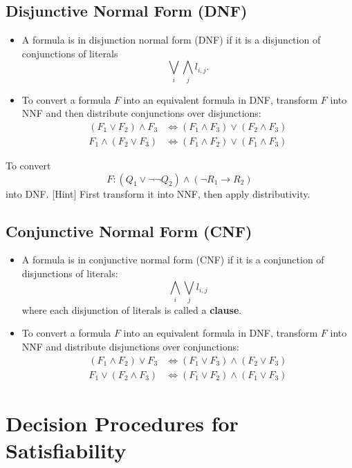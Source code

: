 \subsection{Disjunctive Normal Form (DNF)}
\begin{itemize}
	\item A formula is in disjunction normal form (DNF) if it is a disjunction of conjunctions of literals \[
	\bigvee_i\bigwedge_j l_{i,j}.
	\]
	\item To convert a formula $F$ into an equivalent formula in DNF, transform $F$ into NNF and then distribute conjunctions over disjunctions: \begin{align*}
		(F_1\lor F_2)\land F_3 &\iff (F_1\land F_3)\lor (F_2\land F_3) \\
		F_1\land (F_2\lor F_3) &\iff (F_1\land F_2)\lor (F_1\land F_3)
	\end{align*}
\end{itemize}

\begin{exercise}
	To convert \[
	F:(Q_1\lor\lnot\lnot Q_2)\land(\lnot R_1\to R_2)
	\] into DNF. \textcolor{gray!25!white}{
	[Hint] First transform it into NNF, then apply distributivity.}
\end{exercise}

\subsection{Conjunctive Normal Form (CNF)}
\begin{itemize}
	\item A formula is in conjunctive normal form (CNF) if it is a conjunction of disjunctions of literals: \[
	\bigwedge_i\bigvee_j l_{i,j}
	\] where each disjunction of literals is called a \textbf{clause}.
	\item To convert a formula $F$ into an equivalent formula in DNF, transform $F$ into NNF and distribute disjunctions over conjunctions: \begin{align*}
		(F_1\land F_2)\lor F_3 &\iff (F_1\lor F_3)\land(F_2\lor F_3) \\
		F_1\lor(F_2\land F_3) &\iff (F_1\lor F_2)\land(F_1\lor F_3)
	\end{align*}
\end{itemize}

\section{Decision Procedures for Satisfiability}
